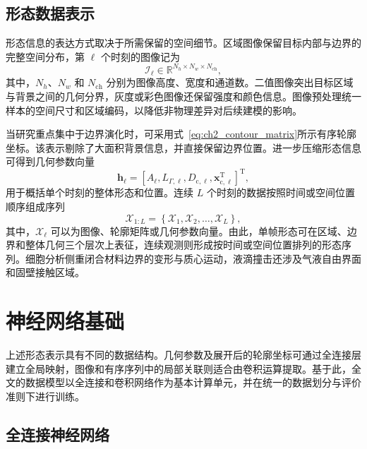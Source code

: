 \subsection{形态数据表示}
\label{subsec:ch2_representation}

形态信息的表达方式取决于所需保留的空间细节。区域图像保留目标内部与边界的完整空间分布，第 $\ell$ 个时刻的图像记为
\begin{equation}
\mathcal{I}_{\ell}
\in
\mathbb{R}^{N_h\times N_w\times N_{\mathrm{ch}}},
\label{eq:ch2_image_representation}
\end{equation}
其中，$N_h$、$N_w$ 和 $N_{\mathrm{ch}}$ 分别为图像高度、宽度和通道数。二值图像突出目标区域与背景之间的几何分界，灰度或彩色图像还保留强度和颜色信息。图像预处理统一样本的空间尺寸和区域编码，以降低非物理差异对后续建模的影响。

当研究重点集中于边界演化时，可采用式~\eqref{eq:ch2_contour_matrix}所示有序轮廓坐标。该表示剔除了大面积背景信息，并直接保留边界位置。进一步压缩形态信息可得到几何参数向量
\begin{equation}
\boldsymbol{h}_{\ell}
=
\left[
A_{\ell},
L_{\Gamma,\ell},
D_{\mathrm c,\ell},
\boldsymbol{x}_{\mathrm c,\ell}^{\mathrm T}
\right]^{\mathrm T},
\label{eq:ch2_geometry_vector}
\end{equation}
用于概括单个时刻的整体形态和位置。连续 $L$ 个时刻的数据按照时间或空间位置顺序组成序列
\begin{equation}
\mathcal{X}_{1:L}
=
\left\{
\mathcal{X}_1,
\mathcal{X}_2,
\ldots,
\mathcal{X}_L
\right\},
\label{eq:ch2_shape_sequence}
\end{equation}
其中，$\mathcal{X}_{\ell}$ 可以为图像、轮廓矩阵或几何参数向量。由此，单帧形态可在区域、边界和整体几何三个层次上表征，连续观测则形成按时间或空间位置排列的形态序列。细胞分析侧重闭合材料边界的变形与质心运动，液滴撞击还涉及气液自由界面和固壁接触区域。

\section{神经网络基础}
\label{sec:ch2_neural_network}

上述形态表示具有不同的数据结构。几何参数及展开后的轮廓坐标可通过全连接层建立全局映射，图像和有序序列中的局部关联则适合由卷积运算提取。基于此，全文的数据模型以全连接和卷积网络作为基本计算单元，并在统一的数据划分与评价准则下进行训练。

\subsection{全连接神经网络}
\label{subsec:ch2_fnn}


